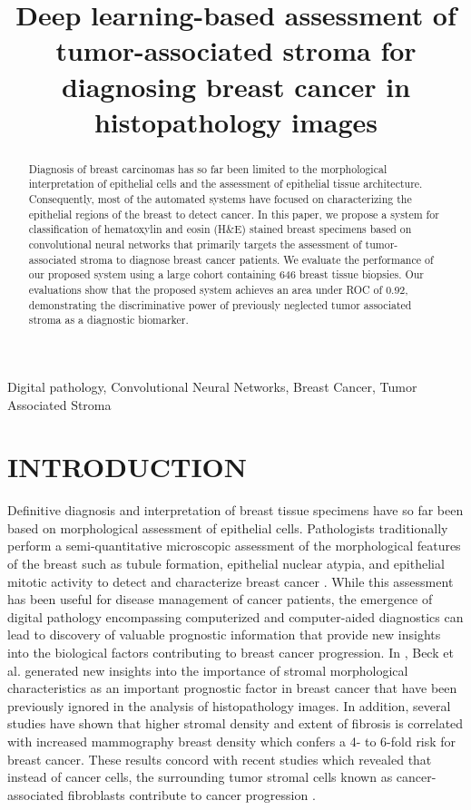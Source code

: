 \documentclass{article}
\title{Deep learning-based assessment of tumor-associated stroma for diagnosing breast cancer in histopathology images}
\begin{document}
\maketitle
\begin{abstract}
Diagnosis of breast carcinomas has so far been limited to the morphological interpretation of epithelial cells and the assessment of epithelial tissue architecture. Consequently, most of the automated systems have focused on characterizing the epithelial regions of the breast to detect cancer.  In this paper,  we propose a system for classification of hematoxylin and eosin (H\&E) stained breast specimens based on convolutional neural networks that primarily targets the assessment of tumor-associated stroma to diagnose breast cancer patients. We evaluate the performance of our proposed system using a large cohort containing 646 breast tissue biopsies. Our evaluations show that the proposed system achieves an area under ROC of 0.92, demonstrating the discriminative power of previously neglected tumor associated stroma as a diagnostic biomarker.
\end{abstract}
\begin{keywords}
Digital pathology, Convolutional Neural Networks, Breast Cancer, Tumor Associated Stroma
\end{keywords}
\section{INTRODUCTION}
\label{sec:intro}

Definitive diagnosis and interpretation of breast tissue specimens have so far been based on morphological assessment of epithelial cells. Pathologists traditionally perform a semi-quantitative microscopic assessment of the morphological features of the breast such as tubule formation, epithelial nuclear atypia, and epithelial mitotic activity to detect and characterize breast cancer \cite{PATEY28}. While this assessment has been useful for disease management of cancer patients, the emergence of digital pathology encompassing computerized and computer-aided diagnostics can lead to discovery of valuable prognostic information that provide new insights into the biological factors contributing to breast cancer progression. In \cite{beck2011}, Beck et al. generated new insights into the importance of stromal morphological characteristics as an important prognostic factor in breast cancer that have been previously ignored in the analysis of histopathology images. \iffalse In that study, the scores of the proposed prognostic model were shown to be strongly associated with overall survival of breast cancer patients.\fi In addition, several studies have shown that higher stromal density and extent of fibrosis is correlated with increased mammography breast density \cite{sun2013} which confers a 4- to 6-fold risk for breast cancer. These results concord with recent studies which revealed that instead of cancer cells, the surrounding tumor stromal cells known as cancer-associated fibroblasts contribute to cancer progression \cite{shiga2015, kalluri2006}.
\end{document}

